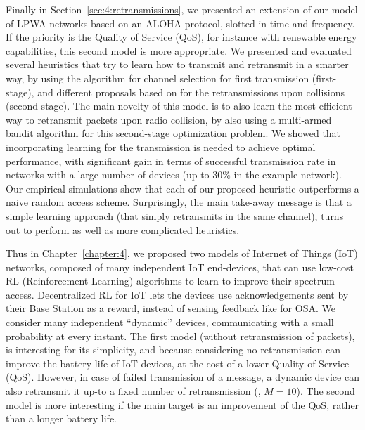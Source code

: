 Finally in Section~\ref{sec:4:retransmissions}, we presented an extension of our model of LPWA networks based on an ALOHA protocol, slotted in time and frequency.
If the priority is the Quality of Service (QoS), for instance with renewable energy capabilities, this second model is more appropriate.
We presented and evaluated several heuristics that try to learn how to transmit and retransmit in a smarter way, by using the \UCB{} algorithm for channel selection for first transmission (first-stage), and different proposals based on \UCB{} for the retransmissions upon collisions (second-stage).
The main novelty of this model is to also learn the most efficient way to retransmit packets upon radio collision, by also using a multi-armed bandit algorithm for this second-stage optimization problem.
%
We showed that incorporating learning for the transmission is needed to achieve optimal performance, with significant gain in terms of successful transmission rate in networks with a large number of devices (up-to $30\%$ in the example network).
Our empirical simulations show that each of our proposed heuristic outperforms a naive random access scheme.
Surprisingly, the main take-away message is that a simple \UCB{} learning approach (that simply retransmits in the same channel), turns out to perform as well as more complicated heuristics.


Thus in Chapter~\ref{chapter:4}, we proposed two models of Internet of Things (IoT) networks, composed of many independent IoT end-devices,
that can use low-cost RL (Reinforcement Learning) algorithms to learn to improve their spectrum access.
%
Decentralized RL for IoT lets the devices use acknowledgements sent by their Base Station as a reward, instead of sensing feedback like for OSA.
We consider many independent ``dynamic'' devices, communicating with a small probability at every instant.
The first model (without retransmission of packets),
is interesting for its simplicity, and because considering no retransmission can improve the battery life of IoT devices, at the cost of a lower Quality of Service (QoS).
%
However, in case of failed transmission of a message, a dynamic device can also retransmit it up-to a fixed number of retransmission (\eg, $M=10$).
%
The second model is more interesting if the main target is an improvement of the QoS, rather than a longer battery life.


